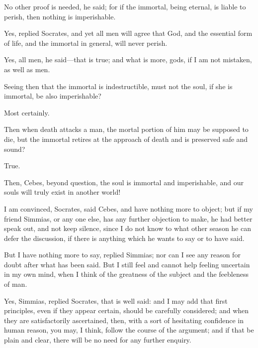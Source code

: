 \documentclass[11pt,letter]{article}
\begin{document}
\par  No other proof is needed, he said; for if the immortal, being eternal, is liable to perish, then nothing is imperishable.

\par  Yes, replied Socrates, and yet all men will agree that God, and the essential form of life, and the immortal in general, will never perish.

\par  Yes, all men, he said—that is true; and what is more, gods, if I am not mistaken, as well as men.

\par  Seeing then that the immortal is indestructible, must not the soul, if she is immortal, be also imperishable?

\par  Most certainly.

\par  Then when death attacks a man, the mortal portion of him may be supposed to die, but the immortal retires at the approach of death and is preserved safe and sound?

\par  True.

\par  Then, Cebes, beyond question, the soul is immortal and imperishable, and our souls will truly exist in another world!

\par  I am convinced, Socrates, said Cebes, and have nothing more to object; but if my friend Simmias, or any one else, has any further objection to make, he had better speak out, and not keep silence, since I do not know to what other season he can defer the discussion, if there is anything which he wants to say or to have said.

\par  But I have nothing more to say, replied Simmias; nor can I see any reason for doubt after what has been said. But I still feel and cannot help feeling uncertain in my own mind, when I think of the greatness of the subject and the feebleness of man.

\par  Yes, Simmias, replied Socrates, that is well said: and I may add that first principles, even if they appear certain, should be carefully considered; and when they are satisfactorily ascertained, then, with a sort of hesitating confidence in human reason, you may, I think, follow the course of the argument; and if that be plain and clear, there will be no need for any further enquiry.
\end{document}

